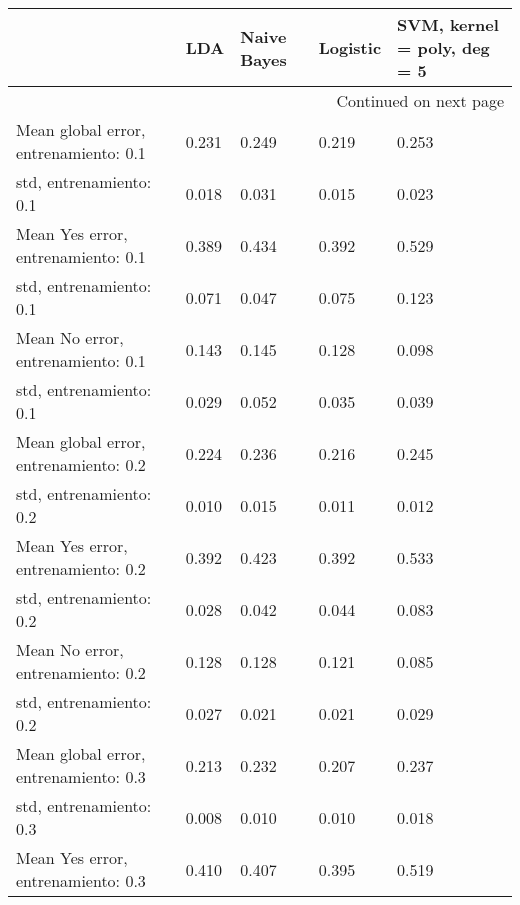 \begin{longtable}{p{4cm}|p{1.5cm}|p{1.5cm}|p{1.5cm}|p{1.5cm}}
\toprule
{} &   LDA &  Naive Bayes &  Logistic &  SVM, kernel = poly, deg = 5 \\
\midrule
\endhead
\midrule
\multicolumn{5}{r}{{Continued on next page}} \\
\midrule
\endfoot

\bottomrule
\endlastfoot
Mean global error, entrenamiento: 0.1 & 0.231 &        0.249 &     0.219 &                        0.253 \\
std, entrenamiento: 0.1               & 0.018 &        0.031 &     0.015 &                        0.023 \\
Mean Yes error, entrenamiento: 0.1    & 0.389 &        0.434 &     0.392 &                        0.529 \\
std, entrenamiento: 0.1               & 0.071 &        0.047 &     0.075 &                        0.123 \\
Mean No error, entrenamiento: 0.1     & 0.143 &        0.145 &     0.128 &                        0.098 \\
std, entrenamiento: 0.1               & 0.029 &        0.052 &     0.035 &                        0.039 \\
Mean global error, entrenamiento: 0.2 & 0.224 &        0.236 &     0.216 &                        0.245 \\
std, entrenamiento: 0.2               & 0.010 &        0.015 &     0.011 &                        0.012 \\
Mean Yes error, entrenamiento: 0.2    & 0.392 &        0.423 &     0.392 &                        0.533 \\
std, entrenamiento: 0.2               & 0.028 &        0.042 &     0.044 &                        0.083 \\
Mean No error, entrenamiento: 0.2     & 0.128 &        0.128 &     0.121 &                        0.085 \\
std, entrenamiento: 0.2               & 0.027 &        0.021 &     0.021 &                        0.029 \\
Mean global error, entrenamiento: 0.3 & 0.213 &        0.232 &     0.207 &                        0.237 \\
std, entrenamiento: 0.3               & 0.008 &        0.010 &     0.010 &                        0.018 \\
Mean Yes error, entrenamiento: 0.3    & 0.410 &        0.407 &     0.395 &                        0.519 \\

\end{longtable}
